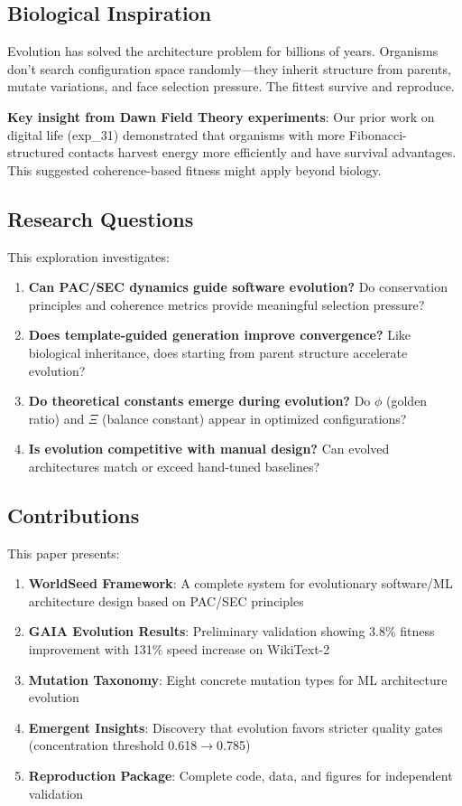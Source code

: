 \documentclass[11pt,a4paper]{article}
\begin{document}
\subsection{Biological Inspiration}

Evolution has solved the architecture problem for billions of years. Organisms don't search configuration space randomly---they inherit structure from parents, mutate variations, and face selection pressure. The fittest survive and reproduce.

\textbf{Key insight from Dawn Field Theory experiments}: Our prior work on digital life (exp\_31) demonstrated that organisms with more Fibonacci-structured contacts harvest energy more efficiently and have survival advantages. This suggested coherence-based fitness might apply beyond biology.

\subsection{Research Questions}

This exploration investigates:

\begin{enumerate}
    \item \textbf{Can PAC/SEC dynamics guide software evolution?} Do conservation principles and coherence metrics provide meaningful selection pressure?
    \item \textbf{Does template-guided generation improve convergence?} Like biological inheritance, does starting from parent structure accelerate evolution?
    \item \textbf{Do theoretical constants emerge during evolution?} Do $\phi$ (golden ratio) and $\Xi$ (balance constant) appear in optimized configurations?
    \item \textbf{Is evolution competitive with manual design?} Can evolved architectures match or exceed hand-tuned baselines?
\end{enumerate}

\subsection{Contributions}

This paper presents:

\begin{enumerate}
    \item \textbf{WorldSeed Framework}: A complete system for evolutionary software/ML architecture design based on PAC/SEC principles
    \item \textbf{GAIA Evolution Results}: Preliminary validation showing 3.8\% fitness improvement with 131\% speed increase on WikiText-2
    \item \textbf{Mutation Taxonomy}: Eight concrete mutation types for ML architecture evolution
    \item \textbf{Emergent Insights}: Discovery that evolution favors stricter quality gates (concentration threshold 0.618$\to$0.785)
    \item \textbf{Reproduction Package}: Complete code, data, and figures for independent validation
\end{enumerate}
\end{document}
